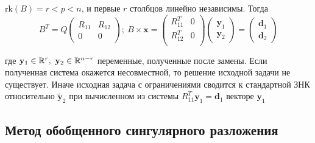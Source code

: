 \begin{remark}
  $\text{rk}(B)=r<p<n$, и первые $r$ столбцов линейно независимы. Тогда
  \[B^T=
    Q\left(\begin{array}{cc}
        R_{11} & R_{12} \\
        0      & 0
      \end{array}\right);\
    B\times\mathbf{x}=\left(\begin{array}{cc}
        R_{11}^T & 0 \\
        R_{12}^T & 0 \\
      \end{array}\right)\left(\begin{array}{c}
        \mathbf{y}_1 \\
        \mathbf{y}_2
      \end{array}\right)=\left(\begin{array}{c}
        \mathbf{d}_1 \\
        \mathbf{d}_2
      \end{array}\right)\]

  где $\mathbf{y}_1\in\R^{r},\ \mathbf{y}_2\in\R^{n-r}$ переменные, полученные после замены.
  Если полученная система окажется несовместной, то решение исходной задачи не существует.
  Иначе исходная задача с ограничениями сводится к стандартной ЗНК относительно $\tilde{\mathbf{y}}_2$
  при вычисленном из системы $R_{11}^T\mathbf{y}_1=\mathbf{d}_1$ векторе $\mathbf{y}_1$
\end{remark}

\subsection*{Метод обобщенного сингулярного разложения}

